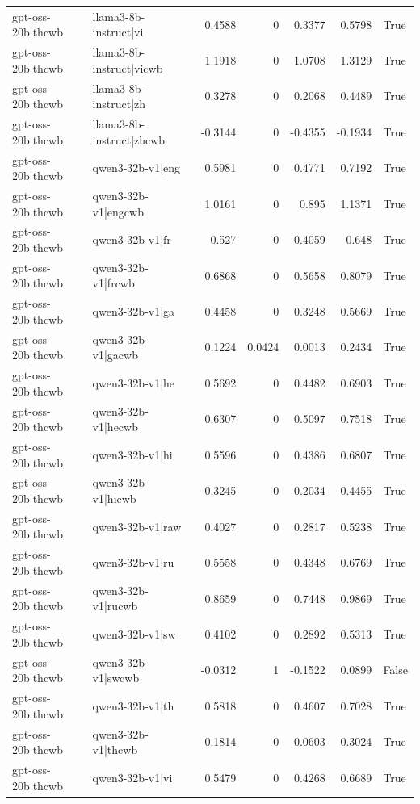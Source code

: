 \begin{table}
\begin{tabular}{l l r r r r l}
gpt-oss-20b|thcwb & llama3-8b-instruct|vi & 0.4588 & 0 & 0.3377 & 0.5798 & True \\
gpt-oss-20b|thcwb & llama3-8b-instruct|vicwb & 1.1918 & 0 & 1.0708 & 1.3129 & True \\
gpt-oss-20b|thcwb & llama3-8b-instruct|zh & 0.3278 & 0 & 0.2068 & 0.4489 & True \\
gpt-oss-20b|thcwb & llama3-8b-instruct|zhcwb & -0.3144 & 0 & -0.4355 & -0.1934 & True \\
gpt-oss-20b|thcwb & qwen3-32b-v1|eng & 0.5981 & 0 & 0.4771 & 0.7192 & True \\
gpt-oss-20b|thcwb & qwen3-32b-v1|engcwb & 1.0161 & 0 & 0.895 & 1.1371 & True \\
gpt-oss-20b|thcwb & qwen3-32b-v1|fr & 0.527 & 0 & 0.4059 & 0.648 & True \\
gpt-oss-20b|thcwb & qwen3-32b-v1|frcwb & 0.6868 & 0 & 0.5658 & 0.8079 & True \\
gpt-oss-20b|thcwb & qwen3-32b-v1|ga & 0.4458 & 0 & 0.3248 & 0.5669 & True \\
gpt-oss-20b|thcwb & qwen3-32b-v1|gacwb & 0.1224 & 0.0424 & 0.0013 & 0.2434 & True \\
gpt-oss-20b|thcwb & qwen3-32b-v1|he & 0.5692 & 0 & 0.4482 & 0.6903 & True \\
gpt-oss-20b|thcwb & qwen3-32b-v1|hecwb & 0.6307 & 0 & 0.5097 & 0.7518 & True \\
gpt-oss-20b|thcwb & qwen3-32b-v1|hi & 0.5596 & 0 & 0.4386 & 0.6807 & True \\
gpt-oss-20b|thcwb & qwen3-32b-v1|hicwb & 0.3245 & 0 & 0.2034 & 0.4455 & True \\
gpt-oss-20b|thcwb & qwen3-32b-v1|raw & 0.4027 & 0 & 0.2817 & 0.5238 & True \\
gpt-oss-20b|thcwb & qwen3-32b-v1|ru & 0.5558 & 0 & 0.4348 & 0.6769 & True \\
gpt-oss-20b|thcwb & qwen3-32b-v1|rucwb & 0.8659 & 0 & 0.7448 & 0.9869 & True \\
gpt-oss-20b|thcwb & qwen3-32b-v1|sw & 0.4102 & 0 & 0.2892 & 0.5313 & True \\
gpt-oss-20b|thcwb & qwen3-32b-v1|swcwb & -0.0312 & 1 & -0.1522 & 0.0899 & False \\
gpt-oss-20b|thcwb & qwen3-32b-v1|th & 0.5818 & 0 & 0.4607 & 0.7028 & True \\
gpt-oss-20b|thcwb & qwen3-32b-v1|thcwb & 0.1814 & 0 & 0.0603 & 0.3024 & True \\
gpt-oss-20b|thcwb & qwen3-32b-v1|vi & 0.5479 & 0 & 0.4268 & 0.6689 & True \\

\end{tabular}
\end{table}
